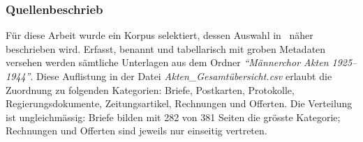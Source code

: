 \documentclass[12pt, a4paper, ngerman, bidi=default]{article}
\begin{document}
\subsubsection{Quellenbeschrieb}\label{Dokumententypen}
\noindent
\begin{minipage}[t]{0.49\textwidth}
  \justifying
  Für diese Arbeit wurde ein Korpus selektiert, dessen Auswahl in~ näher beschrieben wird. 
  Erfasst, benannt und tabellarisch mit groben Metadaten versehen werden sämtliche Unterlagen aus dem Ordner \textit{\enquote{Männerchor Akten 1925--1944}}. 
  Diese Auflistung in der Datei \textit{Akten\_Gesamtübersicht.csv} erlaubt die Zuordnung zu folgenden Kategorien: Briefe, Postkarten, Protokolle, Regierungsdokumente, Zeitungsartikel, 
  Rechnungen und Offerten. Die Verteilung ist ungleichmässig: Briefe bilden mit 282 von 381 Seiten die grösste Kategorie; Rechnungen und Offerten sind jeweils nur einseitig vertreten.
\end{minipage}%
\hfill
\begin{minipage}[t]{0.49\textwidth}
  \centering
  \vspace*{0.3cm} %

  \label{fig:dokumententypen-bar}
\end{minipage}
\end{document}
